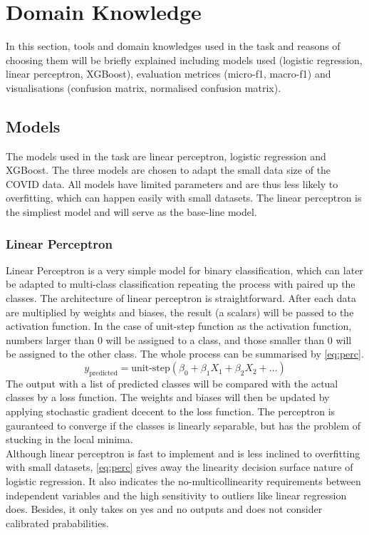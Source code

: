\documentclass[10pt, a4paper, twocolumn]{article} %
\begin{document}
\section{Domain Knowledge}\label{sec:domain_knowledge}
In this section, tools and domain knowledges used in the task and reasons of choosing them  will be 
briefly explained including models used (logistic regression, linear perceptron, XGBoost), evaluation metrices 
(micro-f1, macro-f1) and visualisations (confusion matrix, normalised confusion matrix).\\
\subsection{Models}
The models used in the task are linear perceptron, logistic regression and XGBoost. The three models are chosen to adapt 
the small data size of the COVID data. All models have limited parameters and are thus less likely to overfitting, which 
can happen easily with small datasets. The linear perceptron is the simpliest model and will serve as the base-line model. 
\subsubsection{Linear Perceptron}
Linear Perceptron is a very simple model for binary classification, which can later be adapted to multi-class classification 
repeating the process with paired up the classes. The architecture of linear perceptron is straightforward. After 
each data are multiplied by weights and biases, the result (a scalars) will be passed to the activation function. In the case of 
unit-step function as the activation function, numbers larger than 0 will be assigned to a class, and those smaller than 0 will be 
assigned to the other class. The whole process can be summarised by \autoref{eq:perc}.
\begin{equation}\label{eq:perc}
	y_\text{predicted} = \text{unit-step}\left(\beta_0 + \beta_1X_1+ \beta_2X_2+ ...\right)
\end{equation}
The output with a list of predicted classes will be compared with the actual classes by a loss function. 
The weights and biases will then be updated by applying stochastic gradient dcecent to the loss function. The perceptron is 
gauranteed to converge if the classes is linearly separable, but has the problem of stucking in the local minima.\\[10pt]
Although linear perceptron is fast to implement and is less inclined to overfitting with small datasets, \autoref{eq:perc} gives away 
the linearity decision surface nature of logistic regression. It also indicates the no-multicollinearity requirements between 
independent variables and the high sensitivity to outliers like linear regression does. Besides, it only takes on yes and no outputs 
and does not consider calibrated prababilities.
\end{document}
